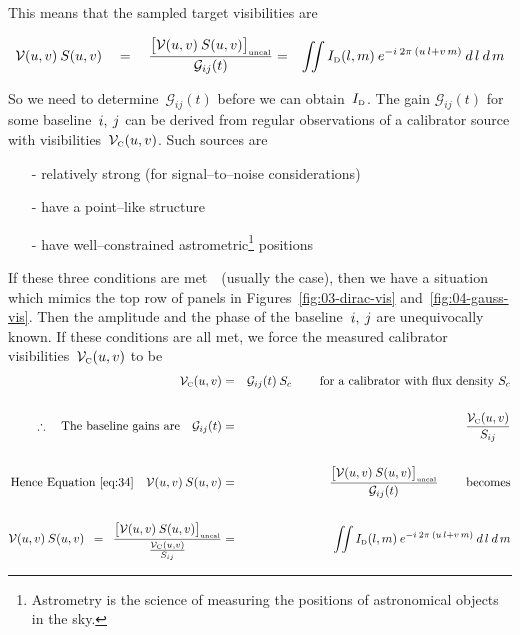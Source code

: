 \documentclass[11pt, a4paper]{article}
\newcommand{\msp}{\mkern \medmuskip}
\begin{document}
This means that the sampled target visibilities are

\begin{eqnarray}
  \label{eq:34}
\mathcal{V}(u,  v) \msp S(u, v) \quad = \quad \frac{\big [\mathcal{V}(u,  v) \msp S(u, v)\big ]_{\mbox{\tiny uncal}}}{\mathcal{G}_{ij}(t)} &=& \iint I_{\mbox{\tiny D}} (l, m) \msp e^{-i \msp 2\pi \msp (u\,l + v\,m)} \msp d\,l \msp d\,m
\end{eqnarray}

So we need to determine~$\mathcal{G}_{ij}(t)$ before we can obtain~$I_{\mbox{\tiny D}}$. The gain $\mathcal{G}_{ij}(t)$ for some baseline~$i,\msp j$ can be derived from regular observations of a calibrator source with visibilities~$\mathcal{V}_{\mbox{\tiny C}}(u, v)$. Such sources are

\begin{itemize}
\item[-] relatively strong (for signal--to--noise considerations)
\item[-] have a point--like structure
\item[-] have well--constrained astrometric\footnote{Astrometry is the science of measuring the positions of astronomical objects in the sky.} positions
\end{itemize}

If these three conditions are met~~(usually the case), then we have a situation which mimics the top row of panels in Figures~\ref{fig:03-dirac-vis} and~\ref{fig:04-gauss-vis}. Then the amplitude and the phase of the baseline~$i,\msp j$ are unequivocally known. If these conditions are all met, we force the measured calibrator visibilities~$\mathcal{V}_{\mbox{\tiny C}}(u, v)$ to be
\begin{eqnarray}
  \label{eq:33}
   \mathcal{V}_{\mbox{\tiny C}}(u, v) &=& \mathcal{G}_{ij}(t)\msp S_c \hspace{0.8cm} \mbox{for a calibrator with flux density }S_c \nonumber \\ \nonumber \\
  \therefore \quad \mbox{The baseline gains are} \quad \mathcal{G}_{ij}(t) &=& \frac{\mathcal{V}_{\mbox{\tiny C}}(u, v)}{S_{ij}} \nonumber \\ \nonumber \\
  \mbox{Hence Equation~\eqref{eq:34}} \quad \mathcal{V}(u,  v) \msp S(u, v) &=& \frac{\big [\mathcal{V}(u,  v) \msp S(u, v)\big ]_{\mbox{\tiny uncal}}}{\mathcal{G}_{ij}(t)} \hspace{0.8cm} \mbox{becomes} \nonumber \\ \nonumber \\
  \mathcal{V}(u,  v) \msp S(u, v) \enspace = \enspace \frac{\big [\mathcal{V}(u,  v) \msp S(u, v)\big ]_{\mbox{\tiny uncal}}}{\frac{\mathcal{V}_{\mbox{\tiny C}}(u, v)}{S_{ij}}} &=& \iint I_{\mbox{\tiny D}} (l, m) \msp e^{-i \msp 2\pi \msp (u\,l + v\,m)} \msp d\,l \msp d\,m \nonumber
\end{eqnarray}
\end{document}
